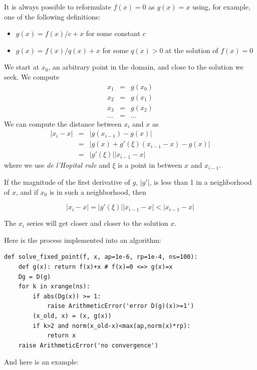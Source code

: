\documentclass[justified,sixbynine]{tufte-book}
\def\ft{\small\tt}
\theoremstyle{plain}%
\theoremstyle{definition}
\theoremstyle{remark}
\begin{document}
\begin{fullwidth}

It is always possible to reformulate $f(x)=0$ as $g(x)=x$ using, for example, one of the following definitions:
\begin{itemize}
\item $g(x) = f(x)/c+x$ for some constant $c$
\item $g(x) = f(x)/q(x)+x$ for some $q(x)>0$ at the solution of $f(x)=0$
\end{itemize}

We start at $x_0$, an arbitrary point in the domain, and close to the solution we seek. We compute
\begin{eqnarray}
x_1 &=& g(x_0) \\
x_2 &=& g(x_1) \\
x_3 &=& g(x_2) \\
... &=& ...
\end{eqnarray}
We can compute the distance between $x_i$ and $x$ as
\begin{eqnarray}
|x_i - x| &=& |g(x_{i-1})-g(x)| \\
          &=& |g(x)+g'(\xi)(x_{i-1}-x)-g(x)| \\
          &=& |g'(\xi)||x_{i-1}-x|
\end{eqnarray}
where we use {\it de l'Hopital rule} and $\xi$ is a point in between $x$ and $x_{i-1}$.

If the magnitude of the first derivative of $g$, $|g'|$, is less than 1 in a neighborhood of $x$, and if $x_0$ is in such a neighborhood, then

\begin{equation}
|x_i - x| = |g'(\xi)||x_{i-1}-x| < |x_{i-1}-x|
\end{equation}

The $x_i$ series will get closer and closer to the solution $x$.

Here is the process implemented into an algorithm:

\begin{lstlisting}[caption={in file: {\ft nlib.py}}]
def solve_fixed_point(f, x, ap=1e-6, rp=1e-4, ns=100):
    def g(x): return f(x)+x # f(x)=0 <=> g(x)=x
    Dg = D(g)
    for k in xrange(ns):
        if abs(Dg(x)) >= 1:
            raise ArithmeticError('error D(g)(x)>=1')
        (x_old, x) = (x, g(x))
        if k>2 and norm(x_old-x)<max(ap,norm(x)*rp):
            return x
    raise ArithmeticError('no convergence')
\end{lstlisting}

And here is an example:


\end{fullwidth}
\end{document}
